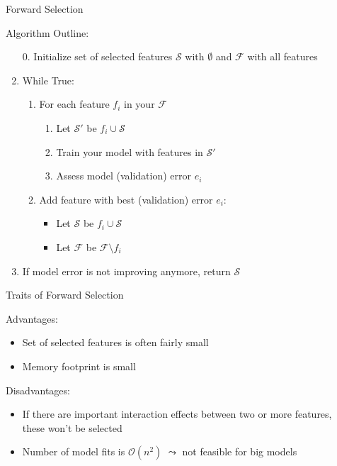 \documentclass[aspectratio=169]{../latex_main/tntbeamer}  %
\begin{document}
	\begin{frame}[c]{Forward Selection}

    Algorithm Outline:
    \begin{enumerate}
        \item[0.] Initialize set of selected features $\mathcal{S}$ with $\emptyset$ and $\mathcal{F}$ with all features
        \item While True:
        \begin{enumerate}
            \item For each feature $f_i$ in your $\mathcal{F}$
            \begin{enumerate}
                \item Let $\mathcal{S}'$ be $f_i \cup \mathcal{S}$
                \item Train your model with features in $\mathcal{S}'$
                \item Assess model (validation) error $e_i$
            \end{enumerate}
            \item Add feature with best (validation) error $e_i$: 
            \begin{itemize}
                \item Let $\mathcal{S}$ be  $f_i \cup \mathcal{S}$
                \item Let $\mathcal{F}$ be $\mathcal{F} \setminus f_i$
            \end{itemize}
        \end{enumerate}
        \item If model error is not improving anymore, return $\mathcal{S}$
    \end{enumerate}


	\end{frame}
	
	\begin{frame}[c]{Traits of Forward Selection}

    Advantages:
    \begin{itemize}
        \item Set of selected features is often fairly small
        \item Memory footprint is small
    \end{itemize}

    Disadvantages:
    \begin{itemize}
        \item If there are important interaction effects between two or more features,\\ these won't be selected
        \item Number of model fits is $\mathcal{O}(n^2)$ $\leadsto$ not feasible for big models
    \end{itemize}

	\end{frame}
	
\end{document}
